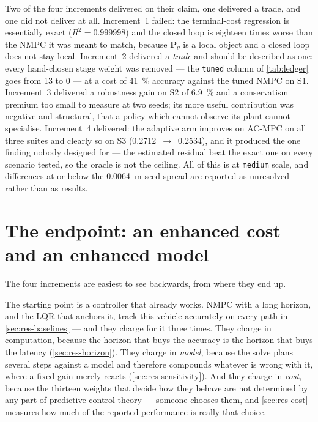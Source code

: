 \documentclass[11pt,a4paper,twoside,openright]{report}
\newcommand{\mat}[1]{\bm{#1}}
\DeclareRobustCommand{\ACMPC}{AC\nbd MPC}
\theoremstyle{plain}
\theoremstyle{definition}
\theoremstyle{remark}
\DeclareRobustCommand{\nbd}{\mbox{-}}
\begin{document}
	Two of the four increments delivered on their claim, one delivered a trade,
	and one did not deliver at all. Increment~1 failed: the terminal-cost
	regression is essentially exact ($R^2=\num{0.999998}$) and the closed loop
	is eighteen times worse than the NMPC it was meant to match, because
	$\mat P_\theta$ is a local object and a closed loop does not stay local.
	Increment~2 delivered a \emph{trade} and should be described as one: every
	hand-chosen stage weight was removed --- the \texttt{tuned} column of
	\cref{tab:ledger} goes from \num{13} to \num{0} --- at a cost of
	\SI{41}{\percent} accuracy against the tuned NMPC on S1. Increment~3
	delivered a robustness gain on S2 of \SI{6.9}{\percent} and a conservatism
	premium too small to measure at two seeds; its more useful contribution was
	negative and structural, that a policy which cannot observe its plant cannot
	specialise. Increment~4 delivered: the adaptive arm improves on \ACMPC{} on
	all three suites and clearly so on S3 (\num{0.2712}~$\to$~\num{0.2534}), and
	it produced the one finding nobody designed for --- the estimated residual
	beat the exact one on every scenario tested, so the oracle is not the
	ceiling. All of this is at \texttt{medium} scale, and differences at or
	below the \SI{0.0064}{\metre} seed spread are reported as unresolved rather
	than as results.

	\section{The endpoint: an enhanced cost and an enhanced model}
	\label{sec:endpoint}

	The four increments are easiest to see backwards, from where they end up.

	The starting point is a controller that already works. NMPC with a long horizon,
	and the LQR that anchors it, track this vehicle accurately on every path in
	\cref{sec:res-baselines} --- and they charge for it three times. They charge in
	computation, because the horizon that buys the accuracy is the horizon that buys
	the latency (\cref{sec:res-horizon}). They charge in \emph{model}, because the
	solve plans several steps against a model and therefore compounds whatever is
	wrong with it, where a fixed gain merely reacts (\cref{sec:res-sensitivity}).
	And they charge in \emph{cost}, because the thirteen weights that decide how
	they behave are not determined by any part of predictive control theory ---
	someone chooses them, and \cref{sec:res-cost} measures how much of the reported
	performance is really that choice.
\end{document}
